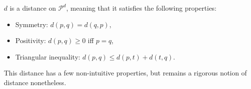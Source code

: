 \begin{theorem}
    $d$ is a distance on $\mathcal{P}^d$, meaning that it satisfies the following properties:
    \begin{itemize}
        \item Symmetry: $d(p, q) = d(q, p)$,
        \item Positivity: $d(p, q) \geq 0$  iff $p = q$,
        \item Triangular inequality: $d(p, q) \leq d(p, t) + d(t, q)$.
    \end{itemize}
\end{theorem}

This distance has a few non-intuitive properties, but remains a rigorous notion of distance nonetheless. %